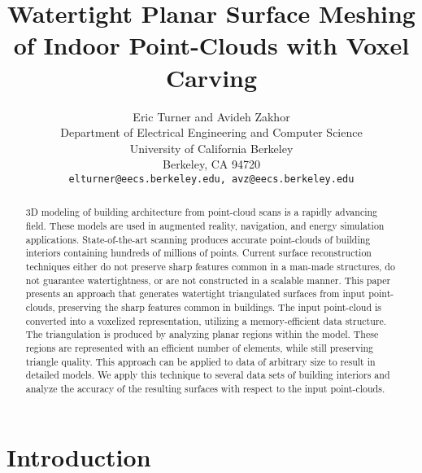 \documentclass[10pt,twocolumn,letterpaper]{article}
\begin{document}
\title{Watertight Planar Surface Meshing of Indoor Point-Clouds with Voxel Carving}

\author{Eric Turner and Avideh Zakhor\\
Department of Electrical Engineering and Computer Science\\
University of California Berkeley\\
Berkeley, CA 94720 \\
{\tt\small elturner@eecs.berkeley.edu, avz@eecs.berkeley.edu}
}

\maketitle

\begin{abstract}
3D modeling of building architecture from point-cloud scans is a rapidly advancing field.  These models are used in augmented reality, navigation, and energy simulation applications.  State-of-the-art scanning produces accurate point-clouds of building interiors containing hundreds of millions of points.  Current surface reconstruction techniques either do not preserve sharp features common in a man-made structures, do not guarantee watertightness, or are not constructed in a scalable manner.  This paper presents an approach that generates watertight triangulated surfaces from input point-clouds, preserving the sharp features common in buildings.  The input point-cloud is converted into a voxelized representation, utilizing a memory-efficient data structure.  The triangulation is produced by analyzing planar regions within the model.  These regions are represented with an efficient number of elements, while still preserving triangle quality.  This approach can be applied to data of arbitrary size to result in detailed models.  We apply this technique to several data sets of building interiors and analyze the accuracy of the resulting surfaces with respect to the input point-clouds. 
\end{abstract}

\section{Introduction}
\end{document}
